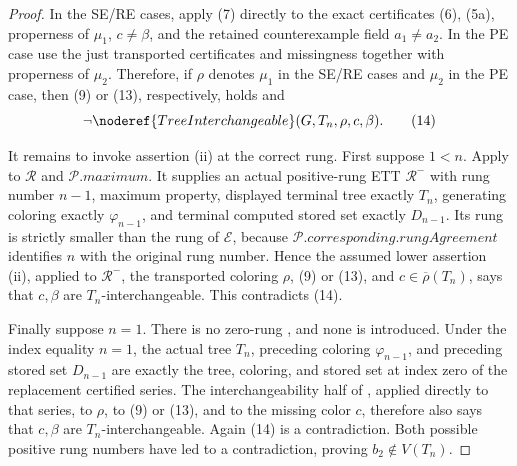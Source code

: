 \begin{proof}
In the SE/RE cases, apply (7) directly to the exact certificates (6),
(5a), properness of \(\mu_1\), \(c\ne\beta\), and the retained
counterexample field \(a_1\ne a_2\).  In the PE case use the just
transported certificates and missingness together with properness of
\(\mu_2\).  Therefore, if \(\rho\) denotes \(\mu_1\) in the SE/RE cases
and \(\mu_2\) in the PE case, then (9) or (13), respectively, holds and
\[
             \neg\noderef{TreeInterchangeable}
                    (G,T_n,\rho,c,\beta).                    \tag{14}
\]

It remains to invoke assertion (ii) at the correct rung.  First suppose
\(1<n\).  Apply  to \(\mathcal R\) and
\(\mathcal P.\mathit{maximum}\).  It supplies an actual positive-rung
ETT \(\mathcal R^-\) with rung number \(n-1\), maximum property,
displayed terminal tree exactly \(T_n\), generating coloring exactly
\(\varphi_{n-1}\), and terminal computed stored set exactly
\(D_{n-1}\).  Its rung is strictly smaller than the rung of
\(\mathcal E\), because
\(\mathcal P.\mathit{corresponding}.\mathit{rungAgreement}\) identifies
\(n\) with the original rung number.  Hence the assumed lower assertion
(ii), applied to \(\mathcal R^-\), the transported coloring \(\rho\),
(9) or (13), and \(c\in\overline\rho(T_n)\), says that \(c,\beta\) are
\(T_n\)-interchangeable.  This contradicts (14).

Finally suppose \(n=1\).  There is no zero-rung
, and none is introduced.  Under the
index equality \(n=1\), the actual tree \(T_n\), preceding coloring
\(\varphi_{n-1}\), and preceding stored set \(D_{n-1}\) are exactly the
tree, coloring, and stored set at index zero of the replacement certified
series.  The interchangeability half of
, applied directly to that series, to
\(\rho\), to (9) or (13), and to the missing color \(c\), therefore also
says that \(c,\beta\) are \(T_n\)-interchangeable.  Again (14) is a
contradiction.  Both possible positive rung numbers have led to a
contradiction, proving \(b_2\notin V(T_n)\).
\end{proof}
